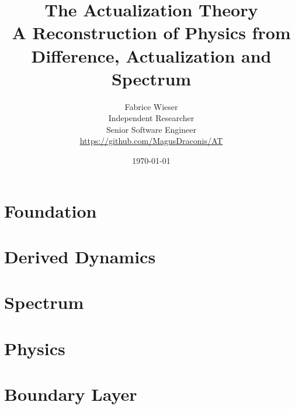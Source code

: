 \documentclass[11pt,openany]{book}
\title{The Actualization Theory\\[0.4em]
  \large A Reconstruction of Physics from Difference, Actualization and Spectrum}
\author{Fabrice Wieser\\[1mm]
  \small Independent Researcher\\[0.5mm]
  \small Senior Software Engineer\\[0.5mm]
  \small \url{https://github.com/MagusDraconis/AT}}
\date{\today}
\begin{document}
\frontmatter


\mainmatter

\part{Foundation}



\part{Derived Dynamics}




\part{Spectrum}




\part{Physics}





\part{Boundary Layer}





\appendix


\backmatter
\end{document}
